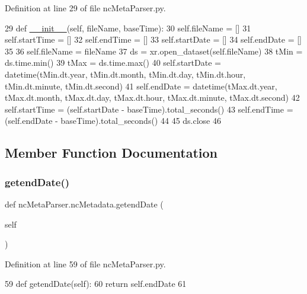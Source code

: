 Definition at line 29 of file nc\+Meta\+Parser.\+py.


\begin{DoxyCode}
29     \textcolor{keyword}{def }\mbox{\hyperlink{classxml_writer_1_1xml_writer_a0b43f6115153b244e10d1933ee33500a}{\_\_init\_\_}}(self, fileName, baseTime):
30         self.fileName = []
31         self.startTime = []
32         self.endTime = []
33         self.startDate = []
34         self.endDate = []
35         
36         self.fileName = fileName        
37         ds = xr.open\_dataset(self.fileName)
38         tMin = ds.time.min()
39         tMax = ds.time.max()
40         self.startDate = datetime(tMin.dt.year, tMin.dt.month, tMin.dt.day, tMin.dt.hour, tMin.dt.minute, 
      tMin.dt.second)
41         self.endDate = datetime(tMax.dt.year, tMax.dt.month, tMax.dt.day, tMax.dt.hour, tMax.dt.minute, 
      tMax.dt.second)
42         self.startTime = (self.startDate - baseTime).total\_seconds()
43         self.endTime = (self.endDate - baseTime).total\_seconds()
44         
45         ds.close
46         
\end{DoxyCode}


\subsection{Member Function Documentation}
\mbox{\label{classnc_meta_parser_1_1nc_metadata_aea9c594ebe892b650ef724bdb73820e4}} 
\subsubsection{\texorpdfstring{getend\+Date()}{getendDate()}}
{\footnotesize\ttfamily def nc\+Meta\+Parser.\+nc\+Metadata.\+getend\+Date (\begin{DoxyParamCaption}\item[{}]{self }\end{DoxyParamCaption})}



Definition at line 59 of file nc\+Meta\+Parser.\+py.


\begin{DoxyCode}
59     \textcolor{keyword}{def }getendDate(self):
60         \textcolor{keywordflow}{return} self.endDate
61         
\end{DoxyCode}
\mbox{\label{classnc_meta_parser_1_1nc_metadata_ad41081000ceb1f7aa122d5e4a1b674e4}} 
